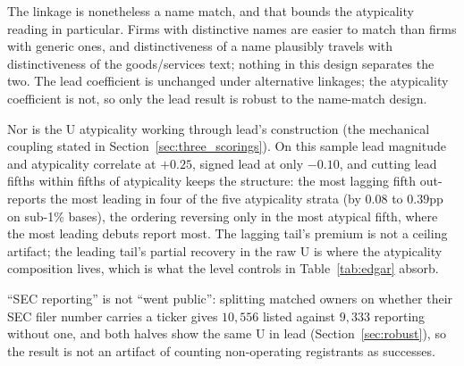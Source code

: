 The linkage is nonetheless a name match, and that bounds the atypicality
reading in particular. Firms with distinctive names are easier to match
than firms with generic ones, and distinctiveness of a name plausibly
travels with distinctiveness of the goods/services text; nothing in this
design separates the two. The lead coefficient is unchanged under
alternative linkages; the atypicality coefficient is not, so only the
lead result is robust to the name-match design.

Nor is the U atypicality working through lead's construction (the
mechanical coupling stated in Section~\ref{sec:three_scorings}). On this
sample lead magnitude and atypicality correlate at $+0.25$, signed lead
at only $-0.10$, and cutting lead fifths within fifths of atypicality
keeps the structure: the most lagging fifth out-reports the most leading
in four of the five atypicality strata (by $0.08$ to $0.39$pp on sub-1\%
bases), the ordering reversing only in the most atypical fifth, where
the most leading debuts report most. The lagging tail's premium is not a ceiling
artifact; the leading tail's partial recovery in the raw U is where the
atypicality composition lives, which is what the level controls in
Table~\ref{tab:edgar} absorb.

``SEC reporting'' is not ``went public'': splitting matched owners on
whether their SEC filer number carries a ticker gives $10{,}556$ listed
against $9{,}333$ reporting without one, and both halves show the same U
in lead (Section~\ref{sec:robust}), so the result is not an artifact of
counting non-operating registrants as successes.

